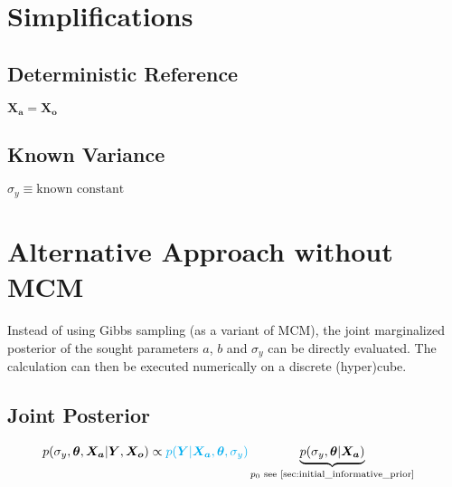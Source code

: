 \documentclass[10pt]{article}
\renewcommand{\vec}[1]{\boldsymbol{#1}}
\begin{document}
    
\section{Simplifications}

\subsection{Deterministic Reference}
$\vec{X_a} = \vec{X_o}$

\subsection{Known Variance}
$\sigma_y \equiv \text{known constant}$


\section{Alternative Approach without MCM}
Instead of using Gibbs sampling (as a variant of MCM), the joint marginalized posterior of the sought parameters $a$, $b$ and $\sigma_y$ can be directly evaluated. 
The calculation can then be executed numerically on a discrete (hyper)cube. 

\subsection{Joint Posterior}
\begin{align}
    p(\sigma_y, \vec{\theta}, \vec{X_a} | \vec{Y}, \vec{X_o}) &\propto {\color{cyan} p(\vec{Y} | \vec{X_a}, \vec{\theta}, \sigma_y)} \underbrace{p(\sigma_y, \vec{\theta} | \vec{X_a})}_{p_0 \text{ see \cref{sec:initial_informative_prior}}}  \label{eq:joined_posterior}
\end{align}
\end{document}
